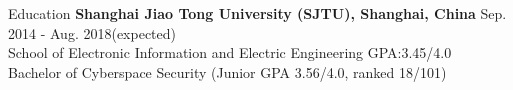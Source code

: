 \documentclass{resume} %
\begin{document}
\vspace{-1em}
\begin{rSection}{Education}
\textbf{Shanghai Jiao Tong University (SJTU), Shanghai, China} \hfill Sep. 2014 - Aug. 2018(expected)\\ %
School of Electronic Information and Electric Engineering  \hfill GPA:3.45/4.0 \\
Bachelor of Cyberspace Security \hfill (Junior GPA 3.56/4.0, ranked 18/101)
\end{rSection}
\end{document}
